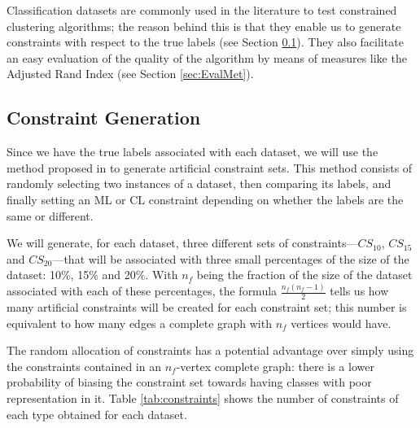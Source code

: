 \documentclass[review]{elsarticle}
\begin{document}
Classification datasets are commonly used in the literature to test constrained clustering algorithms; the reason behind this is that they enable us to generate constraints with respect to the true labels (see Section \ref{sec:ConstGent}). They also facilitate an easy evaluation of the quality of the algorithm by means of measures like the Adjusted Rand Index (see Section \ref{sec:EvalMet}).

\clearpage

\subsection{Constraint Generation} \label{sec:ConstGent}

Since we have the true labels associated with each dataset, we will use the method proposed in \cite{wagstaff2001constrained} to generate artificial constraint sets. This method consists of randomly selecting two instances of a dataset, then comparing its labels, and finally setting an ML or CL constraint depending on whether the labels are the same or different.

We will generate, for each dataset, three different sets of constraints---$CS_{10}$, $CS_{15}$ and $CS_{20}$---that will be associated with three small percentages of the size of the dataset: 10\%, 15\% and 20\%. With $n_f$ being the fraction of the size of the dataset associated with each of these percentages, the formula $\frac{n_f(n_f-1)}{2}$ tells us how many artificial constraints will be created for each constraint set; this number is equivalent to how many edges a complete graph with $n_f$ vertices would have.

The random allocation of constraints has a potential advantage over simply using the constraints contained in an $n_f$-vertex complete graph: there is a lower probability of biasing the constraint set towards having classes with poor representation in it. Table \ref{tab:constraints} shows the number of constraints of each type obtained for each dataset.
\end{document}
